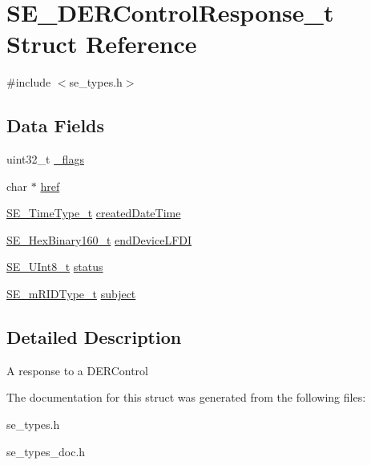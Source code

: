 \hypertarget{structSE__DERControlResponse__t}{}\section{S\+E\+\_\+\+D\+E\+R\+Control\+Response\+\_\+t Struct Reference}
\label{structSE__DERControlResponse__t}


{\ttfamily \#include $<$se\+\_\+types.\+h$>$}

\subsection*{Data Fields}
\begin{DoxyCompactItemize}
\item 
uint32\+\_\+t \hyperlink{group__DERControlResponse_gae6670b4ecc86324d6b218d9761fdae53}{\+\_\+flags}
\item 
char $\ast$ \hyperlink{group__DERControlResponse_ga8e14c284b0b26e7571561c82d2a341f3}{href}
\item 
\hyperlink{group__TimeType_ga6fba87a5b57829b4ff3f0e7638156682}{S\+E\+\_\+\+Time\+Type\+\_\+t} \hyperlink{group__DERControlResponse_ga0914ccbb8b4cd078cbc81028492b4f32}{created\+Date\+Time}
\item 
\hyperlink{group__HexBinary160_ga92b92aa55555bdb75f3a59060f2c1632}{S\+E\+\_\+\+Hex\+Binary160\+\_\+t} \hyperlink{group__DERControlResponse_gaacc63347ab9a7861f4a46bd2b8d9106d}{end\+Device\+L\+F\+DI}
\item 
\hyperlink{group__UInt8_gaf7c365a1acfe204e3a67c16ed44572f5}{S\+E\+\_\+\+U\+Int8\+\_\+t} \hyperlink{group__DERControlResponse_ga2fe7afc8789860b2df5e415466c0ba09}{status}
\item 
\hyperlink{group__mRIDType_gac74622112f3a388a2851b2289963ba5e}{S\+E\+\_\+m\+R\+I\+D\+Type\+\_\+t} \hyperlink{group__DERControlResponse_ga688f4633018b16078b75d07fe9cf8b8b}{subject}
\end{DoxyCompactItemize}


\subsection{Detailed Description}
A response to a D\+E\+R\+Control 

The documentation for this struct was generated from the following files\+:\begin{DoxyCompactItemize}
\item 
se\+\_\+types.\+h\item 
se\+\_\+types\+\_\+doc.\+h\end{DoxyCompactItemize}
